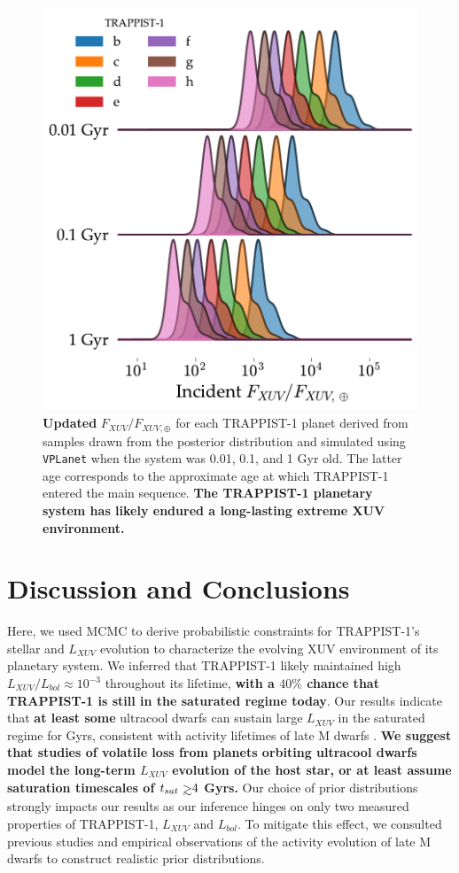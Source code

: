 \documentclass[twocolumn]{aastex62}
\def\gsim{~\rlap{$>$}{\lower 1.0ex\hbox{$\sim$}}}
\newcommand{\xxx}[1]{{\textbf{#1}}}
\newcommand{\vplanet}[0]{\texttt{VPLanet}\xspace}
\begin{document}
\begin{figure}
	\includegraphics[width=0.98\columnwidth]{../Analysis/Fluxes/fluxes.pdf}
   \caption{\xxx{Updated} $F_{XUV}/F_{XUV,\oplus}$ for each TRAPPIST-1 planet derived from samples drawn from the posterior distribution and simulated using \vplanet when the system was 0.01, 0.1, and 1 Gyr old. The latter age corresponds to the approximate age at which TRAPPIST-1 entered the main sequence. \textbf{The TRAPPIST-1 planetary system has likely endured a long-lasting extreme XUV environment.}}%
    \label{fig:fluxes}%
\end{figure}


\section{Discussion and Conclusions} \label{sec:discussion}

Here, we used MCMC to derive probabilistic constraints for TRAPPIST-1's stellar and $L_{XUV}$ evolution to characterize the evolving XUV environment of its planetary system. We inferred that TRAPPIST-1 likely maintained high $L_{XUV}/L_{bol} \approx 10^{-3}$ throughout its lifetime, \xxx{with a $40\%$ chance that TRAPPIST-1 is still in the saturated regime today}. Our results indicate that \xxx{at least some} ultracool dwarfs can sustain large $L_{XUV}$ in the saturated regime for Gyrs, consistent with activity lifetimes of late M dwarfs \citep{West2008}. \xxx{We suggest that studies of volatile loss from planets orbiting ultracool dwarfs model the long-term $L_{XUV}$ evolution of the host star, or at least assume saturation timescales of $t_{sat}{\gsim}4$ Gyrs.} Our choice of prior distributions strongly impacts our results as our inference hinges on only two measured properties of TRAPPIST-1, $L_{XUV}$ and $L_{bol}$. To mitigate this effect, we consulted previous studies and empirical observations of the activity evolution of late M dwarfs to construct realistic prior distributions.
\end{document}
